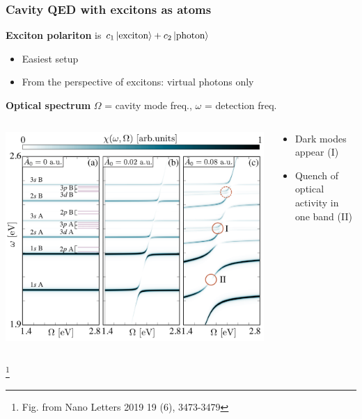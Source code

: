 \documentclass[t]{beamer}
\newcommand\blfootnote[1]{%
\begingroup
\renewcommand\thefootnote{}\footnote{#1}%
\addtocounter{footnote}{-1}%
\endgroup
}
\begin{document}
\begin{frame}
\frametitle{Cavity QED with excitons as atoms}

\textbf{Exciton polariton} is $c_1 \ket*{\text{exciton}} + c_2 \ket*{\text{photon}}$ 

\begin{itemize}
    \item Easiest setup
    \item From the perspective of excitons: virtual photons only
\end{itemize}

\textbf{Optical spectrum} $\Omega$ = cavity mode freq., $\omega$ = detection freq. 

\begin{columns}[T]
    \begin{column}{0.5\textwidth}
        \includegraphics[width=\textwidth]{figs/cavity-exciton-polariton.PNG}
    \end{column}
    \begin{column}{0.5\textwidth}
        \begin{itemize}
            \item Dark modes appear (I)
            \item Quench of optical activity in one band (II) 
        \end{itemize}
    \end{column}
\end{columns}

\blfootnote{Fig. from Nano Letters 2019 19 (6), 3473-3479}

\end{frame}
\end{document}
